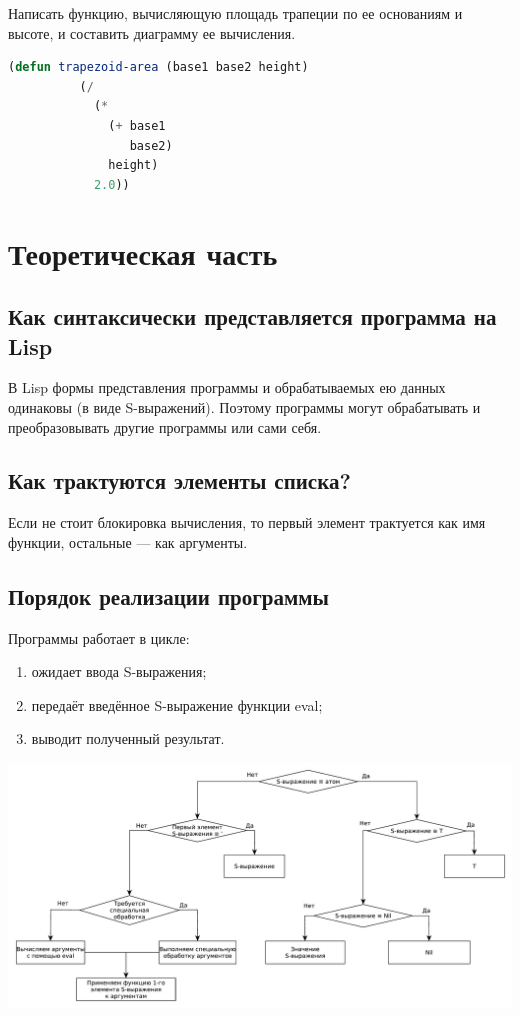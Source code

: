 \documentclass[a4paper,oneside,12pt]{extreport}
\begin{document}
\begin{task}
	Написать функцию, вычисляющую площадь трапеции по ее основаниям и высоте, и составить диаграмму ее вычисления.
	\begin{lstlisting}[language=Lisp, gobble=16]
		(defun trapezoid-area (base1 base2 height)
		  (/
		    (*
		      (+ base1
		         base2)
		      height)
		    2.0))
	\end{lstlisting}
\end{task}

\section*{Теоретическая часть}

\subsection*{Как синтаксически представляется программа на Lisp}

В Lisp формы представления программы и обрабатываемых ею данных одинаковы (в виде S-выражений).
Поэтому программы могут обрабатывать и преобразовывать другие программы или сами себя.

\subsection*{Как трактуются элементы списка?}

Если не стоит блокировка вычисления, то первый элемент трактуется как имя функции, остальные — как аргументы.

\subsection*{Порядок реализации программы}

Программы работает в цикле:
\begin{enumerate}
	\item ожидает ввода S-выражения;
	\item передаёт введённое S-выражение функции eval;
	\item выводит полученный результат.
\end{enumerate}

\includegraphics[width=\linewidth]{inc/img/schema}
\end{document}
